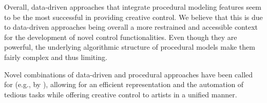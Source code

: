 Overall, data-driven approaches that integrate procedural modeling features seem to be the most successful in providing creative control. We believe that this is due to data-driven approaches being overall a more restrained and accessible context for the development of novel control functionalities. Even though they are powerful, the underlying algorithmic structure of procedural models make them fairly complex and thus limiting.

Novel combinations of data-driven and procedural approaches have been called for (e.g., by \cite{zehnder_2016_dso,xia_2018_ddc}), allowing for an efficient representation and the automation of tedious tasks while offering creative control to artists in a unified manner.
